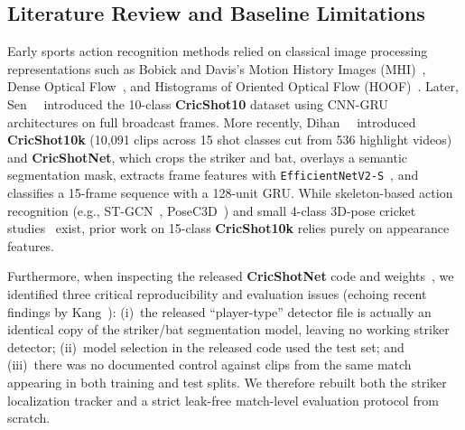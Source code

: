 \subsection{Literature Review and Baseline Limitations}
Early sports action recognition methods relied on classical image processing representations such as Bobick and Davis's Motion History Images (MHI)~\cite{bobick2001recognition}, Dense Optical Flow~\cite{farneback2003two}, and Histograms of Oriented Optical Flow (HOOF)~\cite{chaudhry2009histograms}. Later, Sen~\etal~\cite{sen2021cricshot10} introduced the 10-class \textbf{CricShot10} dataset using CNN-GRU architectures on full broadcast frames. More recently, Dihan~\etal~\cite{dihan2026cricshotnet} introduced \textbf{CricShot10k} (10,091 clips across 15 shot classes cut from 536 highlight videos) and \textbf{CricShotNet}, which crops the striker and bat, overlays a semantic segmentation mask, extracts frame features with \texttt{EfficientNetV2-S}~\cite{tan2021efficientnetv2}, and classifies a 15-frame sequence with a 128-unit GRU. While skeleton-based action recognition (e.g., ST-GCN~\cite{yan2018stgcn}, PoseC3D~\cite{duan2022posec3d}) and small 4-class 3D-pose cricket studies~\cite{shome2026pose} exist, prior work on 15-class \textbf{CricShot10k} relies purely on appearance features.

Furthermore, when inspecting the released \textbf{CricShotNet} code and weights~\cite{dihan2026cricshotnet}, we identified three critical reproducibility and evaluation issues (echoing recent findings by Kang~\cite{kang2025repro}): (i)~the released ``player-type'' detector file is actually an identical copy of the striker/bat segmentation model, leaving no working striker detector; (ii)~model selection in the released code used the test set; and (iii)~there was no documented control against clips from the same match appearing in both training and test splits. We therefore rebuilt both the striker localization tracker and a strict leak-free match-level evaluation protocol from scratch.

